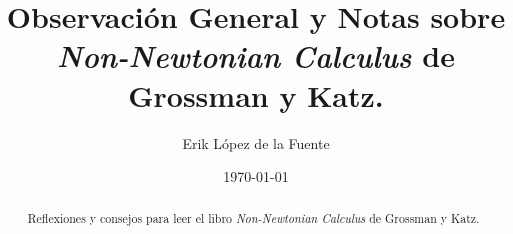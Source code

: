 \documentclass[a4paper, titlepage]{article}
\title{Observación General y Notas sobre \textit{Non-Newtonian Calculus} de Grossman y Katz.}
\author{Erik López de la Fuente}
\date{\today}
\begin{document}
\maketitle

\begin{abstract}
	Reflexiones y consejos para leer el libro \textit{Non-Newtonian Calculus} de Grossman y Katz.
\end{abstract}

\tableofcontents
\newpage






\newpage
\nocite{*}


\end{document}
